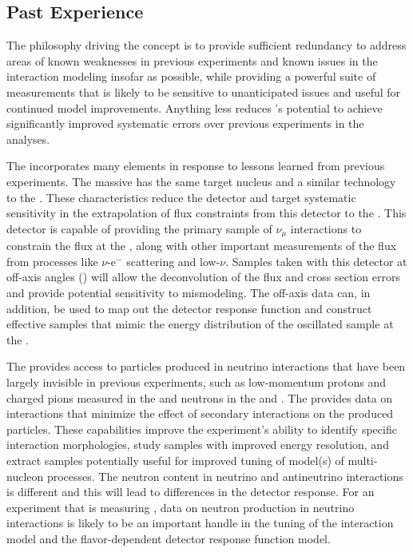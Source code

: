 \subsection{Past Experience}
\label{sec:appx-nd:overview-experience}

The philosophy driving the    concept is to provide sufficient redundancy to address areas of known weaknesses in previous experiments and known issues in the interaction modeling insofar as possible, while providing a powerful suite of measurements that is likely to be sensitive to unanticipated issues and useful for continued model improvements.  Anything less reduces 's potential to achieve significantly improved systematic errors over previous experiments in the  analyses. 

The    incorporates many elements in response to lessons learned from previous experiments. 
The massive    has the same target nucleus and a similar technology to the  . These characteristics reduce the detector and target systematic sensitivity in the  extrapolation of flux constraints from this detector to the  .  This detector is capable of providing the primary  sample of  $\nu_{\mu}$ interactions to constrain the flux at the  , along with other important measurements of the flux from processes like $\nu$-e$^{-}$ scattering and low-$\nu$.  Samples taken with this detector at off-axis angles () will allow the deconvolution of the flux and cross section errors and provide potential sensitivity to mismodeling.  The off-axis data can, in addition, be used to map out the detector response function and construct effective   samples that mimic the energy distribution of the oscillated sample at the  . 

The    provides access to particles produced in neutrino interactions that have been largely invisible in previous experiments, such as low-momentum protons and charged pions measured in the  and neutrons in the  and . The  provides data on interactions that minimize the effect of secondary interactions on the produced particles.  These capabilities improve the experiment's ability to identify specific interaction morphologies, study samples with improved energy resolution, and extract samples potentially useful for improved tuning of model(s) of multi-nucleon processes. The neutron content in neutrino and antineutrino interactions is different and this will lead to differences in the detector response. For an experiment that is measuring , data on neutron production in neutrino interactions is likely to be an important handle in the tuning of the interaction model and the flavor-dependent detector response function model.


